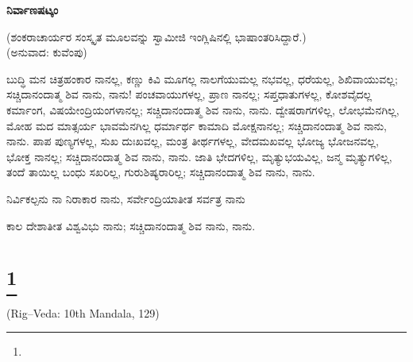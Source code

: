 \begin{myquote}
\end{myquote}

\selectkan

\begin{center}
\textbf{ನಿರ್ವಾಣಷಟ್ಕಂ}
\end{center}

\begin{center}
(ಶಂಕರಾಚಾರ್ಯರ ಸಂಸ್ಕೃತ ಮೂಲವನ್ನು ಸ್ವಾಮೀಜಿ ಇಂಗ್ಲಿಷಿನಲ್ಲಿ ಭಾಷಾಂತರಿಸಿದ್ದಾರೆ.)\\(ಅನುವಾದ: ಕುವೆಂಪು)
\end{center}

ಬುದ್ಧಿ ಮನ ಚಿತ್ರಹಂಕಾರ ನಾನಲ್ಲ, ಕಣ್ಣು ಕಿವಿ ಮೂಗಲ್ಲ ನಾಲಗೆಯುಮಲ್ಲ ನಭವಲ್ಲ, ಧರೆಯಲ್ಲ, ಶಿಖಿವಾಯುವಲ್ಲ; ಸಚ್ಚಿದಾನಂದಾತ್ಮ ಶಿವ ನಾನು, ನಾನು! ಪಂಚವಾಯುಗಳಲ್ಲ, ಪ್ರಾಣ ನಾನಲ್ಲ; ಸಪ್ತಧಾತುಗಳಲ್ಲ, ಕೋಶವೈದಲ್ಲ ಕರ್ಮಾಂಗ, ವಿಷಯೇಂದ್ರಿಯಂಗಳಾನಲ್ಲ; ಸಚ್ಚಿದಾನಂದಾತ್ಮ ಶಿವ ನಾನು, ನಾನು. ದ್ವೇಷರಾಗಗಳಿಲ್ಲ, ಲೋಭಮೆನಗಿಲ್ಲ, ಮೋಹ ಮದ ಮಾತ್ಸರ್ಯ ಭಾವಮೆನಗಿಲ್ಲ ಧರ್ಮಾರ್ಥ ಕಾಮಾದಿ ಮೋಕ್ಷನಾನಲ್ಲ; ಸಚ್ಚಿದಾನಂದಾತ್ಮ ಶಿವ ನಾನು, ನಾನು. ಪಾಪ ಪುಣ್ಯಗಳಲ್ಲ, ಸುಖ ದುಃಖವಲ್ಲ, ಮಂತ್ರ ತೀರ್ಥಗಳಲ್ಲ, ವೇದಮಖವಲ್ಲ ಭೋಜ್ಯ ಭೋಜನವಲ್ಲ, ಭೋಕ್ತ ನಾನಲ್ಲ; ಸಚ್ಚಿದಾನಂದಾತ್ಮ ಶಿವ ನಾನು, ನಾನು. ಜಾತಿ ಭೇದಗಳಿಲ್ಲ, ಮೃತ್ಯುಭಯವಿಲ್ಲ, ಜನ್ಮ ಮೃತ್ಯುಗಳಿಲ್ಲ, ತಂದೆ ತಾಯಿಲ್ಲ ಬಂಧು ಸಖರಿಲ್ಲ, ಗುರುಶಿಷ್ಯರಾರಿಲ್ಲ; ಸಚ್ಚಿದಾನಂದಾತ್ಮ ಶಿವ ನಾನು, ನಾನು.

ನಿರ್ವಿಕಲ್ಪನು ನಾ ನಿರಾಕಾರ ನಾನು, ಸರ್ವೇಂದ್ರಿಯಾತೀತ ಸರ್ವತ್ರ ನಾನು

ಕಾಲ ದೇಶಾತೀತ ವಿಶ್ವವಿಭು ನಾನು; ಸಚ್ಚಿದಾನಂದಾತ್ಮ ಶಿವ ನಾನು, ನಾನು.

\selecteng

\chapter[THE HYMN OF CREATION]{\protect\footnote{}}

\begin{center}
(Rig–Veda: 10th Mandala, 129)
\end{center}

\begin{myquote}
\end{myquote}

